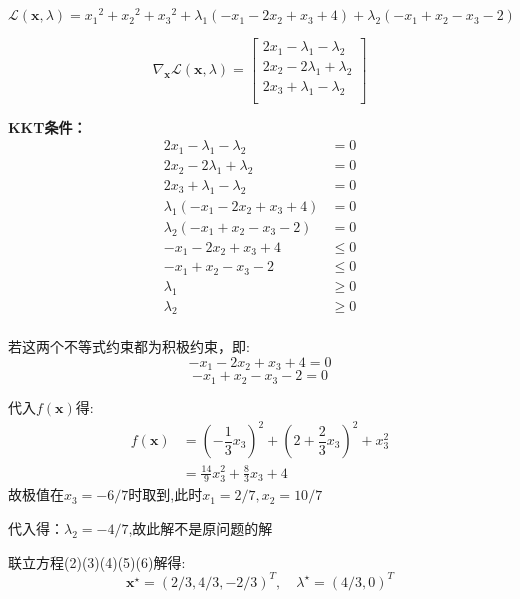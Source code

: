 \documentclass[UTF8]{ctexart}
\begin{document}
\begin{enumerate}
\[\mathcal{L}(\bm{x},\lambda)={x_1}^2+{x_2}^2+{x_3}^2+\lambda_1(-{x_1}-2{x_2}+{x_3}+4)+\lambda_2(-{x_1}+{x_2}-{x_3}-2)\]

\[\nabla_{\bm{x}}\mathcal{L}(\bm{x},\lambda)=\begin{bmatrix}
2x_1-\lambda_1-\lambda_2\\
2x_2-2\lambda_1+\lambda_2\\
2x_3+\lambda_1-\lambda_2\\
\end{bmatrix}\]

\textbf{KKT条件：}
\begin{align}
2x_1-\lambda_1-\lambda_2&=0\\
2x_2-2\lambda_1+\lambda_2&=0\\
2x_3+\lambda_1-\lambda_2&=0\\
\lambda_1(-{x_1}-2{x_2}+{x_3}+4)&=0\\
\lambda_2(-{x_1}+{x_2}-{x_3}-2)&=0\\
-{x_1}-2{x_2}+{x_3}+4 &\leq 0 \nonumber\\
-{x_1}+{x_2}-{x_3}-2 &\leq 0 \nonumber \\
\lambda_1&\geq 0\nonumber\\
\lambda_2&\geq 0\nonumber\\
\end{align}

若这两个不等式约束都为积极约束，即:
\[-{x_1}-2{x_2}+{x_3}+4=0\]
\[-{x_1}+{x_2}-{x_3}-2=0\]

代入$f(\bm{x})$得:
\begin{align}
f(\bm{x})&=(-\dfrac{1}{3}x_3)^2+(2+\dfrac{2}{3}x_3)^2+x_3^2\\
&=\frac{14 }{9}x_3^2+\frac{8 }{3}x_3+4
\end{align}
故极值在$x_3=-6/7$时取到,此时$x_1=2/7,x_2=10/7$

代入得：$\lambda_2=-4/7$,故此解不是原问题的解

联立方程(2)(3)(4)(5)(6)解得:
\[\bm{x}^{\star}=(2/3,4/3,-2/3)^T,\quad \lambda^{\star}=(4/3,0)^T\]


\end{enumerate}
\end{document}
